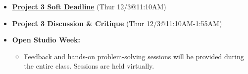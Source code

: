\def\dMon{4/12}%
\def\dTues{4/13}%
\def\dWed{4/14}%
\def\dThur{4/15}%
\placeDate

\def\tues{12/1}%
\def\thur{12/3}%
% 
\begin{itemize}[noitemsep,topsep=0pt,leftmargin=*]
    \item \textcolor{defaultColor}{\ul{\textbf{Project 3 Soft Deadline}} (Thur \thur @11:10AM)}
    \item \textcolor{defaultColor}{\textbf{Project 3 Discussion \& Critique} (Thur \thur @11:10AM-1:55AM)}
    \item \textbf{Open Studio Week:}
    \begin{itemize}
        \item Feedback and hands-on problem-solving sessions will be provided during the entire class. Sessions are held virtually. 
    \end{itemize}
\end{itemize}